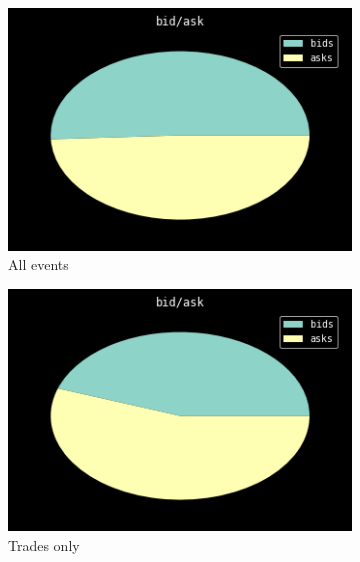 \begin{figure}[H]
    \centering
    \begin{subfigure}[b]{0.45\textwidth}
        \includegraphics[width=\textwidth]{images/ob-ba-pie-all}
        \caption{All events}
        \label{fig:data-imbalance-events}
    \end{subfigure}
    \begin{subfigure}[b]{0.45\textwidth}
        \includegraphics[width=\textwidth]{images/ob-ba-pie-trades}
        \caption{Trades only}
        \label{fig:data-imbalance-trades}
    \end{subfigure}
    \begin{subfigure}[b]{0.45\textwidth}

\end{subfigure}
\end{figure}

